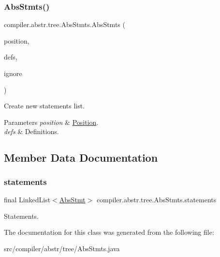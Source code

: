 \subsubsection{\texorpdfstring{Abs\+Stmts()}{AbsStmts()}\hspace{0.1cm}{\footnotesize\ttfamily [2/2]}}
{\footnotesize\ttfamily compiler.\+abstr.\+tree.\+Abs\+Stmts.\+Abs\+Stmts (\begin{DoxyParamCaption}\item[{\hyperlink{classcompiler_1_1_position}{Position}}]{position,  }\item[{Linked\+List$<$ \hyperlink{classcompiler_1_1abstr_1_1tree_1_1def_1_1_abs_def}{Abs\+Def} $>$}]{defs,  }\item[{boolean}]{ignore }\end{DoxyParamCaption})}

Create new statements list. 
\begin{DoxyParams}{Parameters}
{\em position} & \hyperlink{classcompiler_1_1_position}{Position}. \\
\hline
{\em defs} & Definitions. \\
\hline
\end{DoxyParams}


\subsection{Member Data Documentation}
\mbox{\label{classcompiler_1_1abstr_1_1tree_1_1_abs_stmts_acdb710e241c750ea503cb826b0de182a}} 
\subsubsection{\texorpdfstring{statements}{statements}}
{\footnotesize\ttfamily final Linked\+List$<$\hyperlink{classcompiler_1_1abstr_1_1tree_1_1_abs_stmt}{Abs\+Stmt}$>$ compiler.\+abstr.\+tree.\+Abs\+Stmts.\+statements}

Statements. 

The documentation for this class was generated from the following file\+:\begin{DoxyCompactItemize}
\item 
src/compiler/abstr/tree/Abs\+Stmts.\+java\end{DoxyCompactItemize}
